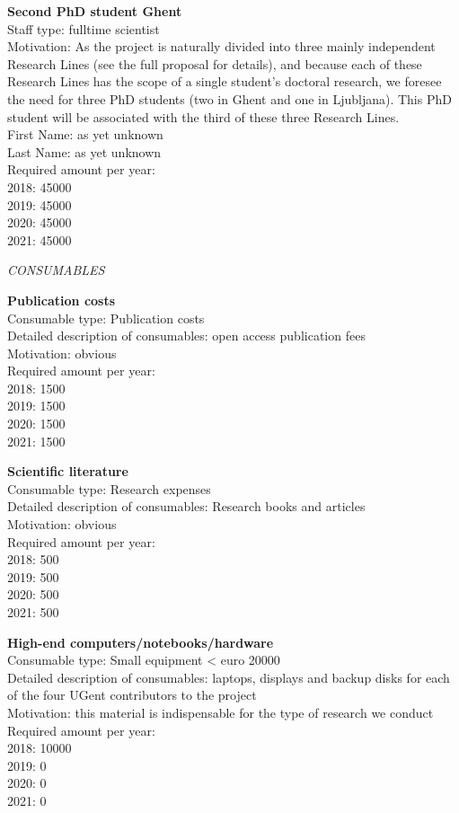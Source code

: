 \documentclass[11pt,dvipsnames,usenames,a4paper]{article}
\begin{document}
{\bf Second PhD student Ghent}\\
Staff type: fulltime scientist\\
Motivation: As the project is naturally divided into three mainly independent Research Lines (see the full proposal for details), and because each of these Research Lines has the scope of a single student's doctoral research, we foresee the need for three PhD students (two in Ghent and one in Ljubljana). This PhD student will be associated with the third of these three Research Lines.\\
First Name: as yet unknown\\
Last Name: as yet unknown\\
Required amount per year:\\
2018: 45000\\
2019: 45000\\
2020: 45000\\
2021: 45000

{\it CONSUMABLES}

{\bf Publication costs}\\
Consumable type: Publication costs\\
Detailed description of consumables: open access publication fees\\
Motivation: obvious\\
Required amount per year:\\
2018: 1500\\
2019: 1500\\
2020: 1500\\
2021: 1500

{\bf Scientific literature}\\
Consumable type: Research expenses\\
Detailed description of consumables: Research books and articles\\
Motivation: obvious\\
Required amount per year:\\
2018: 500\\
2019: 500\\
2020: 500\\
2021: 500


{\bf High-end computers/notebooks/hardware}\\
Consumable type: Small equipment < euro 20000\\
Detailed description of consumables: laptops, displays and backup disks for each of the four UGent contributors to the project\\
Motivation: this material is indispensable for the type of research we conduct\\
Required amount per year:\\
2018: 10000\\
2019: 0\\
2020: 0\\
2021: 0
\end{document}
